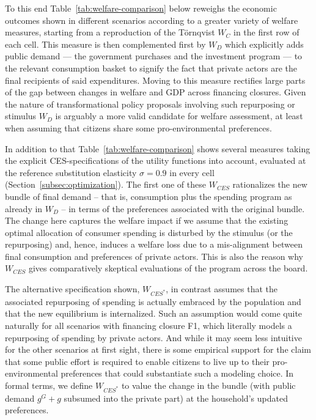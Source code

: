 To this end Table~\ref{tab:welfare-comparison} below reweighs the economic outcomes shown in different scenarios according to a greater variety of welfare measures, starting from a reproduction of the T\"ornqvist $W_C$ in the first row of each cell. This measure is then complemented first by $W_D$ which explicitly adds public demand --- the government purchases and the investment program --- to the relevant consumption basket to signify the fact that private actors are the final recipients of said expenditures. Moving to this measure rectifies large parts of the gap between changes in welfare and GDP across financing closures. Given the nature of transformational policy proposals involving such repurposing or stimulus $W_D$ is arguably a more valid candidate for welfare assessment, at least when assuming that citizens share some pro-environmental preferences.

In addition to that Table~\ref{tab:welfare-comparison} shows several measures taking the explicit CES-specifications of the utility functions into account, evaluated at the reference substitution elasticity $\sigma=0.9$ in every cell (Section~\ref{subsec:optimization}). The first one of these $W_{CES}$ rationalizes the new bundle of final demand -- that is, consumption plus the spending program as already in $W_D$ -- in terms of the preferences associated with the original bundle. The change here captures the welfare impact if we assume that the existing optimal allocation of consumer spending is disturbed by the stimulus (or the repurposing) and, hence, induces a welfare loss due to a mis-alignment between final consumption and preferences of private actors. This is also the reason why $W_{CES}$ gives comparatively skeptical evaluations of the program across the board.

The alternative specification shown, $W_{CES^*}$, in contrast assumes that the associated repurposing of spending is actually embraced by the population and that the new equilibrium is internalized. Such an assumption would come quite naturally for all scenarios with financing closure F1, which literally models a repurposing of spending by private actors. And while it may seem less intuitive for the other scenarios at first sight, there is some empirical support for the claim that some public effort is required to enable citizens to live up to their pro-environmental preferences \citep{Wissen.2021,Braganza.2025} that could substantiate such a modeling choice. In formal terms, we define $W_{CES^*}$ to value the change in the bundle (with public demand $g^{G}+g$ subsumed into the private part) at the household's updated preferences.

